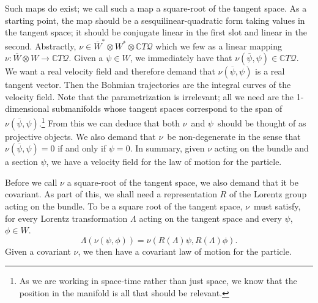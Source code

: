 \documentclass[11pt]{article}
\theoremstyle{remark}
\begin{document}
Such maps do exist; we call such a map a  
 square-root of the tangent space. As a starting point, 
the map should be a sesquilinear-quadratic form
taking values in the tangent space; it should be conjugate linear in the
first slot and 
linear in the second. Abstractly, 
$\ensuremath{\nu} \in \ensuremath{{\ensuremath{\overline{\ensuremath{W}}}}^{*}} \otimes \ensuremath{{\ensuremath{W}}^{*}}
\otimes \ensuremath{\mathbb{C}}\ensuremath{T \ensuremath{\mathcal{Q}}}$ which we few as a linear mapping $\ensuremath{\nu}: \ensuremath{\overline{\ensuremath{W}}} \otimes
\ensuremath{W} \to \ensuremath{\mathbb{C}}\ensuremath{T \ensuremath{\mathcal{Q}}}$.  
Given a $\ensuremath{\psi} \in \ensuremath{W}$, we immediately
have that  
$\ensuremath{\nu}(\ensuremath{\overline{\ensuremath{\psi}}}, \ensuremath{\psi}) \in \ensuremath{\mathbb{C}}\ensuremath{T \ensuremath{\mathcal{Q}}}$. 
 We want a real velocity field and therefore demand
that $\ensuremath{\nu}(\ensuremath{\overline{\ensuremath{\psi}}}, \ensuremath{\psi}) $ is a real tangent vector. Then the
Bohmian trajectories are the integral curves of the velocity field. 
 Note that the
parametrization is irrelevant; all we need are the 
 1-dimensional submanifolds whose tangent
spaces correspond to the span of $\ensuremath{\nu}(\ensuremath{\overline{\ensuremath{\psi}}}, \ensuremath{\psi})$.\footnote{As 
we are working in space-time rather than just
space, we know that the position in the manifold is all that should be
relevant.}
From this we can deduce that both \ensuremath{\nu}\ and \ensuremath{\psi}\ should be
thought of as projective objects. We also demand that \ensuremath{\nu}\ be
non-degenerate in the
sense that 
$\ensuremath{\nu}(\ensuremath{\overline{\ensuremath{\psi}}}, \ensuremath{\psi})  =
0 $ if and only if $\ensuremath{\psi} = 0$. In summary, given $\ensuremath{\nu}$ acting on the
 bundle and a
section $\ensuremath{\psi}$, we  have a velocity field for the
law of motion for the particle. 

Before we call $\ensuremath{\nu}$ a square-root of the tangent space, we also
demand that it be covariant. As part of this, we shall need a
representation $R$ of the Lorentz group acting on the bundle. 
To be a square root of the tangent space, \ensuremath{\nu}\ must satisfy, for
every Lorentz
transformation $\Lambda$ acting on the tangent space and every $\ensuremath{\psi}$,
$\phi \in \ensuremath{W}$.
\[
\Lambda (\ensuremath{\nu}(\ensuremath{\psi}, \phi) ) = \ensuremath{\nu} (R(\Lambda) \ensuremath{\psi}, R(\Lambda) \phi). 
\]
Given a covariant $\ensuremath{\nu}$, we then have a covariant law of motion for
the particle.
\end{document}
